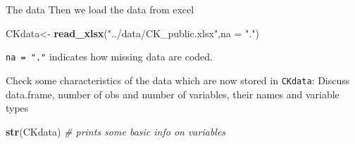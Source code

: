 \documentclass[
  ignorenonframetext,
]{beamer}
\newenvironment{Shaded}{\begin{snugshade}}{\end{snugshade}}
\newcommand{\AttributeTok}[1]{\textcolor[rgb]{0.13,0.29,0.53}{#1}}
\newcommand{\CommentTok}[1]{\textcolor[rgb]{0.56,0.35,0.01}{\textit{#1}}}
\newcommand{\FunctionTok}[1]{\textcolor[rgb]{0.13,0.29,0.53}{\textbf{#1}}}
\newcommand{\NormalTok}[1]{#1}
\newcommand{\OtherTok}[1]{\textcolor[rgb]{0.56,0.35,0.01}{#1}}
\newcommand{\StringTok}[1]{\textcolor[rgb]{0.31,0.60,0.02}{#1}}
\begin{document}
\begin{frame}[fragile]{The data}
\label{the-data}
Then we load the data from excel

\begin{Shaded}
\begin{Highlighting}[]
\NormalTok{CKdata}\OtherTok{\textless{}{-}} \FunctionTok{read\_xlsx}\NormalTok{(}\StringTok{"../data/CK\_public.xlsx"}\NormalTok{,}\AttributeTok{na =} \StringTok{"."}\NormalTok{)}
\end{Highlighting}
\end{Shaded}

\texttt{na = "."} indicates how missing data are coded.

Check some characteristics of the data which are now stored in
\texttt{CKdata}:
\textcolor{student}{Discuss data.frame, number of obs and number of variables, their names and variable types}

\scriptsize

\begin{Shaded}
\begin{Highlighting}[]
\FunctionTok{str}\NormalTok{(CKdata)  }\CommentTok{\# prints some basic info on variables}
\end{Highlighting}
\end{Shaded}


\end{frame}
\end{document}
